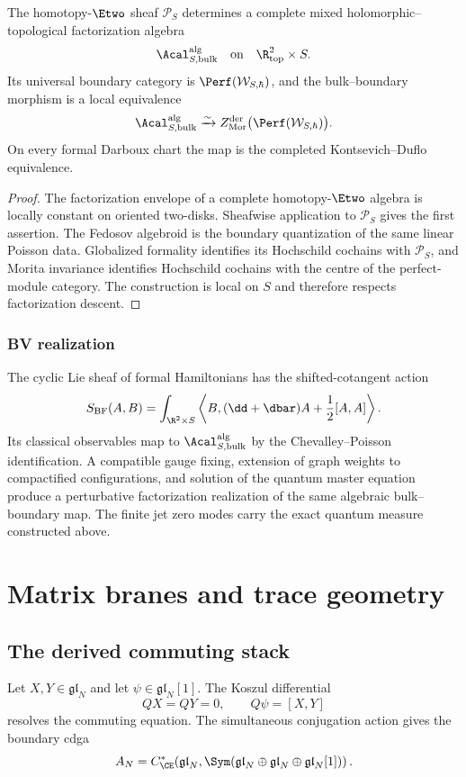 \begin{theorem}
The homotopy-$\Etwo$ sheaf $\mathcal P_S$ determines a complete mixed holomorphic--topological factorization algebra
\[
 \Acal^{\mathrm{alg}}_{S,\mathrm{bulk}}
\quad\text{on}\quad
 \R^2_{\mathrm{top}}\times S.
\]
Its universal boundary category is $\Perf(\mathcal W_{S,\hbar})$, and the bulk--boundary morphism is a local equivalence
\[
 \Acal^{\mathrm{alg}}_{S,\mathrm{bulk}}
 \xrightarrow{\sim}
 Z^{\mathrm{der}}_{\mathrm{Mor}}
 \bigl(\Perf(\mathcal W_{S,\hbar})\bigr).
\]
On every formal Darboux chart the map is the completed Kontsevich--Duflo equivalence.
\end{theorem}
\begin{proof}
The factorization envelope of a complete homotopy-$\Etwo$ algebra is locally constant on oriented two-disks.  Sheafwise application to $\mathcal P_S$ gives the first assertion.  The Fedosov algebroid is the boundary quantization of the same linear Poisson data.  Globalized formality identifies its Hochschild cochains with $\mathcal P_S$, and Morita invariance identifies Hochschild cochains with the centre of the perfect-module category.  The construction is local on $S$ and therefore respects factorization descent.
\end{proof}

\section{BV realization}
The cyclic Lie sheaf of formal Hamiltonians has the shifted-cotangent action
\[
 S_{\mathrm{BF}}(A,B)
 =\int_{\R^2\times S}
 \left\langle B,(\dd+\dbar)A+\frac12[A,A]\right\rangle.
\]
Its classical observables map to $\Acal^{\mathrm{alg}}_{S,\mathrm{bulk}}$ by the Chevalley--Poisson identification.  A compatible gauge fixing, extension of graph weights to compactified configurations, and solution of the quantum master equation produce a perturbative factorization realization of the same algebraic bulk--boundary map.  The finite jet zero modes carry the exact quantum measure constructed above.

\part{Matrix branes and trace geometry}

\chapter{The derived commuting stack}
Let $X,Y\in\mathfrak{gl}_N$ and let $\psi\in\mathfrak{gl}_N[1]$.  The Koszul differential
\[
 QX=QY=0,
 \qquad
 Q\psi=[X,Y]
\]
resolves the commuting equation.  The simultaneous conjugation action gives the boundary cdga
\[
 A_N=C^*_{\CE}\!\left(
 \mathfrak{gl}_N,
 \Sym(\mathfrak{gl}_N\oplus\mathfrak{gl}_N\oplus\mathfrak{gl}_N[1])
 \right).
\]

